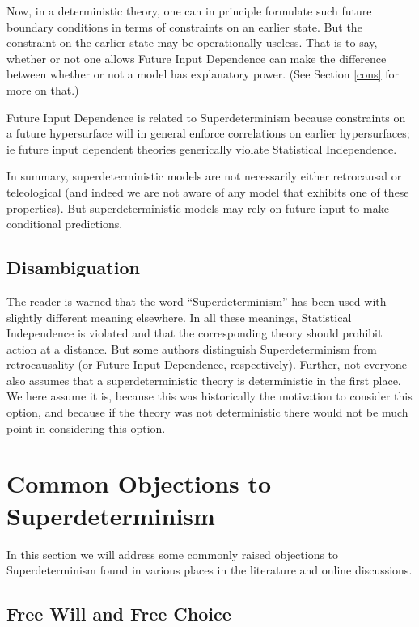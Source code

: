 \documentclass[12pt]{article}
\begin{document}
Now, in a deterministic theory, one can in principle formulate such future boundary conditions in terms of constraints on an earlier state. But the constraint on the earlier state may be operationally useless. That is to say, whether or not one allows Future Input Dependence can make the difference between whether or not a model has explanatory power. (See Section
\ref{cons} for more on that.) 

Future Input Dependence is related to Superdeterminism because constraints on a future hypersurface will in general enforce correlations on earlier hypersurfaces; ie future input dependent theories generically violate Statistical Independence.

In summary, superdeterministic models are not necessarily either retrocausal or teleological (and indeed we are not aware of any model that exhibits one of these properties). But superdeterministic models may rely on future input to make conditional predictions. 


\subsection{Disambiguation}

The reader is warned that the word ``Superdeterminism'' has been used with slightly different meaning elsewhere. In all these meanings, Statistical Independence is violated and that the corresponding theory should prohibit action at a distance. But some authors  \cite{Wharton,Price} distinguish Superdeterminism from retrocausality (or Future Input Dependence, respectively). Further, not everyone also assumes that a superdeterministic theory is deterministic in the first place. We here assume it is, because this was historically the motivation to consider this option, and because if the theory was not deterministic there would not be much point in considering this option. 


\section{Common Objections to Superdeterminism}

In this section we will address some commonly raised objections to Superdeterminism found in various places in the literature and online discussions. 

\subsection{Free Will and Free Choice}
\label{FreeWill}
\end{document}
